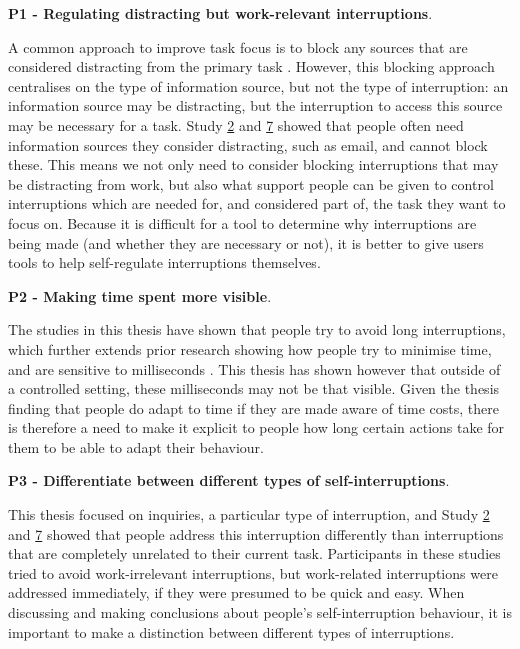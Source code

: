 \textbf{P1 - Regulating distracting but work-relevant interruptions}. 

A common approach to improve task focus is to block any sources that are considered distracting from the primary task \citep{Kim2017, Mark2018}. However, this blocking approach centralises on the type of information source, but not the type of interruption: an information source may be distracting, but the interruption to access this source may be necessary for a task. Study \hyperref[st:Study2]{2} and \hyperref[st:Study7]{7} showed that people often need information sources they consider distracting, such as email, and cannot block these. This means we not only need to consider blocking interruptions that may be distracting from work, but also what support people can be given to control interruptions which are needed for, and considered part of, the task they want to focus on. Because it is difficult for a tool to determine why interruptions are being made (and whether they are necessary or not), it is better to give users tools to help self-regulate interruptions themselves. 


\textbf{P2 - Making time spent more visible}. 

The studies in this thesis have shown that people try to avoid long interruptions, which further extends prior research showing how people try to minimise time, and are sensitive to milliseconds \citep{Charman2003, Gray2004}. This thesis has shown however that outside of a controlled setting, these milliseconds may not be that visible. Given the thesis finding that people do adapt to time if they are made aware of time costs, there is therefore a need to make it explicit to people how long certain actions take for them to be able to adapt their behaviour.

\textbf{P3 - Differentiate between different types of self-interruptions}. 

This thesis focused on inquiries, a particular type of interruption, and Study \hyperref[st:Study2]{2} and \hyperref[st:Study7]{7} showed that people address this interruption differently than interruptions that are completely unrelated to their current task. Participants in these studies tried to avoid work-irrelevant interruptions, but work-related interruptions were addressed immediately, if they were presumed to be quick and easy. When discussing and making conclusions about people's self-interruption behaviour, it is important to make a distinction between different types of interruptions.

